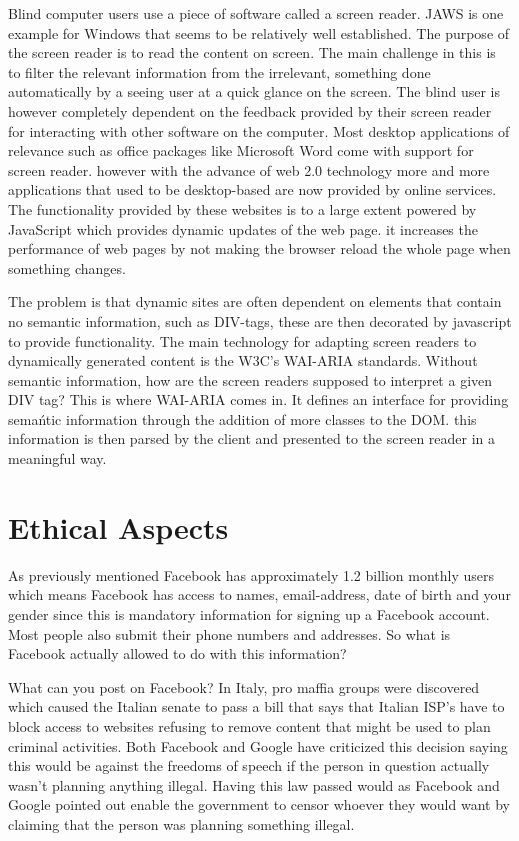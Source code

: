 \documentclass[conference]{IEEEtran}
\begin{document}
Blind computer users use a piece of software called a screen reader. JAWS is
one example for Windows that seems to be relatively well established. The
purpose of the screen reader is to read the content on screen. The main
challenge in this is to filter the relevant information from the irrelevant,
something done automatically by a seeing user at a quick glance on the screen.
The blind user is however completely dependent on the feedback provided by
their screen reader for interacting with other software on the computer. Most
desktop applications of relevance such as office packages like Microsoft Word
come with support for screen reader. however with the advance of web 2.0
technology more and more applications that used to be desktop-based are now
provided by online services. The functionality provided by these websites is to
a large extent powered by JavaScript which provides dynamic updates of the web
page. it increases the performance of web pages by not making the browser
reload the whole page when something changes. 

The problem\cite{jung2004} is that dynamic sites are often dependent on
elements that contain no semantic information, such as DIV-tags, these are then
decorated by javascript to provide functionality. The main technology for
adapting screen readers to dynamically generated content is the W3C’s WAI-ARIA
standards. Without semantic information, how are the screen readers supposed to
interpret a given DIV tag? This is where WAI-ARIA comes in. It defines an
interface for providing semańtic information through the addition of more
classes to the DOM.  this information is then parsed by the client and
presented to the screen reader in a meaningful way.

\section{Ethical Aspects}
\label{ethics}
As previously mentioned Facebook has approximately  1.2 billion monthly users
which means Facebook has access to names, email-address, date of birth and your
gender since this is mandatory information for signing up a Facebook account.
Most people also submit their phone numbers and addresses. So what is Facebook
actually allowed to do with this information?

What can you post on Facebook?
In Italy, pro maffia groups were discovered which caused the Italian senate to
pass a bill that says that Italian ISP’s have to block access to websites
refusing to remove content that might be used to plan criminal activities. Both
Facebook and Google have criticized this decision saying this would be against
the freedoms of speech if the person in question actually wasn't planning
anything illegal.  Having this law passed would as Facebook and Google pointed
out enable the government to censor whoever they would want by claiming that
the person was planning something illegal. 
\end{document}

